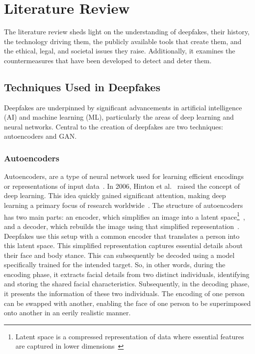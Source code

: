 
\chapter{Literature Review}\label{chapter:literature}
The literature review sheds light on the understanding of deepfakes, their history,
the technology driving them, the publicly available tools that create them, and
the ethical, legal, and societal issues they raise. Additionally, it examines the
countermeasures that have been developed to detect and deter them.

\section{Techniques Used in Deepfakes}\label{chapter:techniques}
Deepfakes are underpinned by significant advancements in artificial intelligence (\ac{AI})
and machine learning (ML), particularly the areas of deep learning and neural
networks. Central to the creation of deepfakes are two techniques:
autoencoders and \ac{GAN}.

\subsection{Autoencoders}
Autoencoders, are a type of neural network used for learning
efficient encodings or representations of input data~\cite{doi:10.1126/science.1127647}.
In 2006, Hinton et al.~\cite{10.1145/3297156.3297210,doi:10.1126/science.1127647}
raised the concept of deep learning. This idea quickly gained significant attention,
making deep learning a primary focus of research worldwide~\cite{simonyan2015deep}.
The structure of autoencoders has two main parts: an encoder, which simplifies an
image into a latent space\footnote{Latent space is a compressed representation of data where essential
	features are captured in lower dimensions~\cite{enwiki:1169655673}}~\cite{latent-space-medium}, and a decoder,
which rebuilds the image using that simplified representation~\cite{latent-space-medium,enwiki:1170192786}. Deepfakes use this
setup with a common encoder that translates a person into this latent space. This simplified
representation captures essential details about their face and body stance. This can subsequently
be decoded using a model specifically trained for the intended target. So, in other words,
during the encoding phase, it extracts facial details from two distinct individuals,
identifying and storing the shared facial characteristics. Subsequently, in the decoding phase,
it presents the information of these two individuals. The encoding of one person can be
swapped with another, enabling the face of one person to be superimposed onto another
in an eerily realistic manner.

